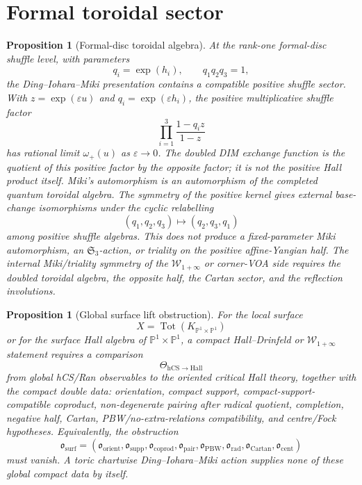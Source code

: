 \documentclass[11pt]{amsart}
\providecommand{\bP}{\mathbb{P}}
\providecommand{\cW}{\mathcal{W}}
\providecommand{\hCS}{\mathrm{hCS}}
\newtheorem{proposition}[theorem]{Proposition}
\theoremstyle{definition}
\theoremstyle{remark}
\begin{document}
\section{Formal toroidal sector}

\begin{proposition}[Formal-disc toroidal algebra]
At the rank-one formal-disc shuffle level, with parameters
\[
        q_i=\exp(h_i),\qquad q_1q_2q_3=1,
\]
the Ding--Iohara--Miki presentation contains a compatible positive shuffle
sector. With \(z=\exp(\varepsilon u)\) and
\(q_i=\exp(\varepsilon h_i)\), the positive multiplicative shuffle factor
\[
        \prod_{i=1}^3\frac{1-q_i z}{1-z}
\]
has rational limit \(\omega_+(u)\) as \(\varepsilon\to0\). The doubled DIM
exchange function is the quotient of this positive factor by the opposite
factor; it is not the positive Hall product itself. Miki's automorphism is
an automorphism of the completed quantum toroidal algebra. The symmetry of
the positive kernel gives external base-change isomorphisms under the
cyclic relabelling
\[
        (q_1,q_2,q_3)\longmapsto(q_2,q_3,q_1)
\]
among positive shuffle algebras. This does not produce a fixed-parameter
Miki automorphism, an \(\mathfrak{S}_3\)-action, or triality on the
positive affine-Yangian half. The internal Miki/triality symmetry of the
\(\cW_{1+\infty}\) or corner-VOA side requires the doubled toroidal
algebra, the opposite half, the Cartan sector, and the reflection
involutions.
\end{proposition}

\begin{proposition}[Global surface lift obstruction]
For the local surface
\[
        X=\operatorname{Tot}(K_{\bP^1\times\bP^1})
\]
or for the surface Hall algebra of \(\bP^1\times\bP^1\), a compact
Hall--Drinfeld or \(\cW_{1+\infty}\) statement requires a comparison
\[
        \Theta_{\hCS\to\mathrm{Hall}}
\]
from global hCS/Ran observables to the oriented critical Hall theory,
together with the compact double data: orientation, compact support,
compact-support-compatible coproduct, non-degenerate pairing after radical
quotient, completion, negative half, Cartan, PBW/no-extra-relations
compatibility, and centre/Fock hypotheses. Equivalently, the
obstruction
\[
        \mathfrak{o}_{\mathrm{surf}}
        =(\mathfrak{o}_{\mathrm{orient}},
          \mathfrak{o}_{\mathrm{supp}},
          \mathfrak{o}_{\mathrm{coprod}},
          \mathfrak{o}_{\mathrm{pair}},
          \mathfrak{o}_{\mathrm{PBW}},
          \mathfrak{o}_{\mathrm{rad}},
          \mathfrak{o}_{\mathrm{Cartan}},
          \mathfrak{o}_{\mathrm{cent}})
\]
must vanish. A toric chartwise Ding--Iohara--Miki action supplies none of
these global compact data by itself.
\end{proposition}
\end{document}
